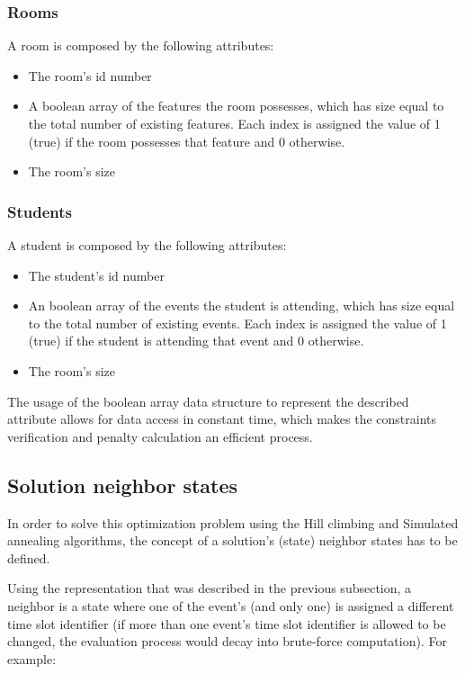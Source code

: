 \documentclass[conference]{IEEEtran}
\begin{document}
\subsubsection{Rooms}

A room is composed by the following attributes:
\begin{itemize}
    \item The room's id number
    \item A boolean array of the features the room possesses, which has size equal to the total number of existing features. Each index is assigned the value of 1 (true) if the room possesses that feature and 0 otherwise.
    \item The room's size
\end{itemize}

\subsubsection{Students}

A student is composed by the following attributes:
\begin{itemize}
    \item The student's id number
    \item An boolean array of the events the student is attending, which has size equal to the total number of existing events. Each index is assigned the value of 1 (true) if the student is attending that event and 0 otherwise.
    \item The room's size
\end{itemize}

The usage of the boolean array data structure to represent the described attribute allows for data access in constant time, which makes the constraints verification and penalty calculation an efficient process. 

\subsection{Solution neighbor states}

In order to solve this optimization problem using the Hill climbing and Simulated annealing algorithms, the concept of a solution's (state) neighbor states has to be defined.

Using the representation that was described in the previous subsection, a neighbor is a state where one of the event's (and only one) is assigned a different time slot identifier (if more than one event's time slot identifier is allowed to be changed, the evaluation process would decay into brute-force computation). For example:
\end{document}
